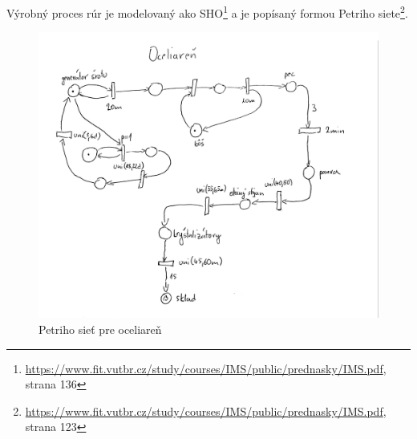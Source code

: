 \documentclass[]{article}
\begin{document}
Výrobný proces rúr je modelovaný ako SHO\footnote{\url{https://www.fit.vutbr.cz/study/courses/IMS/public/prednasky/IMS.pdf}, strana 136} a je popísaný formou Petriho siete\footnote{\url{https://www.fit.vutbr.cz/study/courses/IMS/public/prednasky/IMS.pdf}, strana 123}.

\begin{figure}[h!]
	\includegraphics[width=\textwidth]{pn_oceliaren.jpg}
	\caption{Petriho sieť pre oceliareň}
\end{figure}
\end{document}
